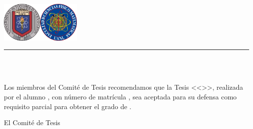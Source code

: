 \documentclass{sty/uanl}
\begin{document}
{\renewcommand{\baselinestretch}{1.1}\selectfont
\begin{center}\vspace*{-25mm}\hspace*{-10mm}
\begin{minipage}{170.5mm}
\hspace{-1.5mm}\includegraphics[height=20mm]{Figuras/uanl.png}\hfill{}\hbox{\includegraphics[height=20mm]{Figuras/fcfm.png}}
\hrule\vspace{0.5mm}
\scalebox{.5}{\MakeUppercase{\uanl}}\hfill\scalebox{.5}{\MakeUppercase{\fcfm}}\medskip
\end{minipage}
\vskip4mm{\sc\large\uanl\\\fcfm\\[3pt]\pifi}\vskip6mm
\end{center}

Los miembros del Comité de Tesis recomendamos que la Tesis <<\titulo>>, realizada por el alumno \autor, con número de matrícula \matricula, sea aceptada para su defensa como requisito parcial para obtener el grado de \grado\orientacion.
\ifdoctorado\vskip10mm\else\vskip8mm\fi

\begin{center}
El Comité de Tesis\\
\ifdoctorado\vskip15mm\else\vskip25mm\fi


\end{center}}
\end{document}
